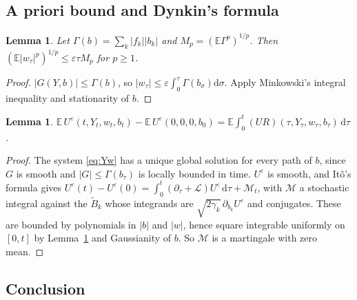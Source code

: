\documentclass[11pt]{article}
\newcommand{\dd}{\mathrm{d}}
\newcommand{\E}{\mathbb{E}}
\newcommand{\eps}{\varepsilon}
\newcommand{\cL}{\mathcal{L}}
\newtheorem{lemma}[theorem]{Lemma}
\theoremstyle{remark}
\begin{document}
\subsection{A priori bound and Dynkin's formula}

\begin{lemma}\label{lem:apriori}
Let $\Gamma(b) = \sum_k|f_k||b_k|$ and $M_p = (\E\Gamma^p)^{1/p}$. Then
$(\E|w_\tau|^p)^{1/p}\le\eps\tau M_p$ for $p\ge1$.
\end{lemma}

\begin{proof}
$|G(Y,b)|\le\Gamma(b)$, so $|w_\tau|\le\eps\int_0^\tau\Gamma(b_\sigma)\dd\sigma$.
Apply Minkowski's integral inequality and stationarity of $b$.
\end{proof}

\begin{lemma}\label{lem:dynkin}
$\E\,U^\eps(t,Y_t,w_t,b_t) - \E\,U^\eps(0,0,0,b_0)
= \E\int_0^t (UR)(\tau,Y_\tau,w_\tau,b_\tau)\,\dd\tau$.
\end{lemma}

\begin{proof}
The system \eqref{eq:Yw} has a unique global solution for every path of $b$,
since $G$ is smooth and $|G|\le\Gamma(b_\tau)$ is locally bounded in time.
$U^\eps$ is smooth, and It\^o's formula gives
$U^\eps(t) - U^\eps(0) = \int_0^t(\partial_\tau+\cL)U^\eps\,\dd\tau + \mathcal{M}_t$,
with $\mathcal{M}$ a stochastic integral against the $\tilde B_k$ whose
integrands are $\sqrt{2\gamma_k}\,\partial_{b_k}U^\eps$ and conjugates. These
are bounded by polynomials in $|b|$ and $|w|$, hence square integrable
uniformly on $[0,t]$ by Lemma~\ref{lem:apriori} and Gaussianity of $b$. So
$\mathcal{M}$ is a martingale with zero mean.
\end{proof}

\subsection{Conclusion}
\end{document}
